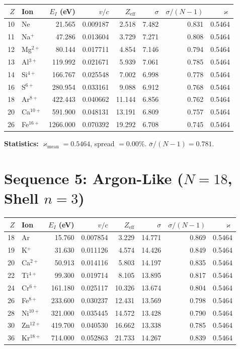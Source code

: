 \documentclass{article}
\newcommand{\kop}{\varkappa}
\begin{document}
\begin{center}
\small
\begin{tabular}{rlrrrrrr}
\toprule
$Z$ & Ion & $E_I$ (eV) & $v/c$ & $Z_{\text{eff}}$ & $\sigma$ & $\sigma/(N{-}1)$ & $\kop$ \\
\midrule
10 & Ne          &   21.565 & 0.009187 &  2.518 &  7.482 & 0.831 & 0.5464 \\
11 & Na$^+$      &   47.286 & 0.013604 &  3.729 &  7.271 & 0.808 & 0.5464 \\
12 & Mg$^{2+}$   &   80.144 & 0.017711 &  4.854 &  7.146 & 0.794 & 0.5464 \\
13 & Al$^{3+}$   &  119.992 & 0.021671 &  5.939 &  7.061 & 0.785 & 0.5464 \\
14 & Si$^{4+}$   &  166.767 & 0.025548 &  7.002 &  6.998 & 0.778 & 0.5464 \\
16 & S$^{6+}$    &  280.954 & 0.033161 &  9.088 &  6.912 & 0.768 & 0.5464 \\
18 & Ar$^{8+}$   &  422.443 & 0.040662 & 11.144 &  6.856 & 0.762 & 0.5464 \\
20 & Ca$^{10+}$  &  591.900 & 0.048131 & 13.191 &  6.809 & 0.757 & 0.5464 \\
26 & Fe$^{16+}$  & 1266.000 & 0.070392 & 19.292 &  6.708 & 0.745 & 0.5464 \\
\bottomrule
\end{tabular}
\end{center}

\textbf{Statistics:} $\kop_{\text{mean}} = 0.5464$, spread $= 0.00\%$.  $\bar{\sigma}/(N{-}1) = 0.781$.


\section{Sequence 5: Argon-Like ($N = 18$, Shell $n = 3$)}

\begin{center}
\small
\begin{tabular}{rlrrrrrr}
\toprule
$Z$ & Ion & $E_I$ (eV) & $v/c$ & $Z_{\text{eff}}$ & $\sigma$ & $\sigma/(N{-}1)$ & $\kop$ \\
\midrule
18 & Ar          &   15.760 & 0.007854 &  3.229 & 14.771 & 0.869 & 0.5464 \\
19 & K$^+$       &   31.630 & 0.011126 &  4.574 & 14.426 & 0.849 & 0.5464 \\
20 & Ca$^{2+}$   &   50.913 & 0.014116 &  5.803 & 14.197 & 0.835 & 0.5464 \\
22 & Ti$^{4+}$   &   99.300 & 0.019714 &  8.105 & 13.895 & 0.817 & 0.5464 \\
24 & Cr$^{6+}$   &  161.180 & 0.025117 & 10.326 & 13.674 & 0.804 & 0.5464 \\
26 & Fe$^{8+}$   &  233.600 & 0.030237 & 12.431 & 13.569 & 0.798 & 0.5464 \\
28 & Ni$^{10+}$  &  321.000 & 0.035445 & 14.572 & 13.428 & 0.790 & 0.5464 \\
30 & Zn$^{12+}$  &  419.700 & 0.040530 & 16.662 & 13.338 & 0.785 & 0.5464 \\
36 & Kr$^{18+}$  &  714.000 & 0.052863 & 21.733 & 14.267 & 0.839 & 0.5464 \\
\bottomrule
\end{tabular}
\end{center}
\end{document}
